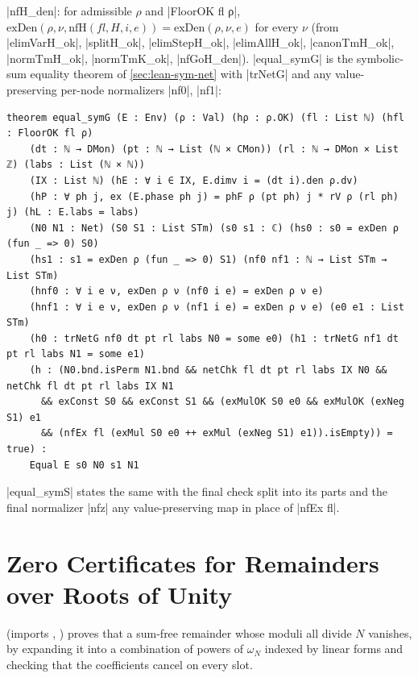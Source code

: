 \begin{theorem}[Soundness]\label{thm:lean-sym-hint}
\begin{sloppypar}\lean|nfH_den|: for admissible $\rho$ and \lean|FloorOK fl ρ|, $\mathrm{exDen}(\rho,\nu,\mathrm{nfH}(fl,H,i,e))=\mathrm{exDen}(\rho,\nu,e)$ for every $\nu$ (from \lean|elimVarH_ok|, \lean|splitH_ok|, \lean|elimStepH_ok|, \lean|elimAllH_ok|, \lean|canonTmH_ok|, \lean|normTmH_ok|, \lean|normTmK_ok|, \lean|nfGoH_den|). \lean|equal_symG| is the symbolic-sum equality theorem of \cref{sec:lean-sym-net} with \lean|trNetG| and any value-preserving per-node normalizers \lean|nf0|, \lean|nf1|:\end{sloppypar}
\begin{lstlisting}[style=lean]
theorem equal_symG (E : Env) (ρ : Val) (hρ : ρ.OK) (fl : List ℕ) (hfl : FloorOK fl ρ)
    (dt : ℕ → DMon) (pt : ℕ → List (ℕ × CMon)) (rl : ℕ → DMon × List ℤ) (labs : List (ℕ × ℕ))
    (IX : List ℕ) (hE : ∀ i ∈ IX, E.dimv i = (dt i).den ρ.dv)
    (hP : ∀ ph j, ex (E.phase ph j) = phF ρ (pt ph) j * rV ρ (rl ph) j) (hL : E.labs = labs)
    (N0 N1 : Net) (S0 S1 : List STm) (s0 s1 : ℂ) (hs0 : s0 = exDen ρ (fun _ => 0) S0)
    (hs1 : s1 = exDen ρ (fun _ => 0) S1) (nf0 nf1 : ℕ → List STm → List STm)
    (hnf0 : ∀ i e ν, exDen ρ ν (nf0 i e) = exDen ρ ν e)
    (hnf1 : ∀ i e ν, exDen ρ ν (nf1 i e) = exDen ρ ν e) (e0 e1 : List STm)
    (h0 : trNetG nf0 dt pt rl labs N0 = some e0) (h1 : trNetG nf1 dt pt rl labs N1 = some e1)
    (h : (N0.bnd.isPerm N1.bnd && netChk fl dt pt rl labs IX N0 && netChk fl dt pt rl labs IX N1
      && exConst S0 && exConst S1 && (exMulOK S0 e0 && exMulOK (exNeg S1) e1
      && (nfEx fl (exMul S0 e0 ++ exMul (exNeg S1) e1)).isEmpty)) = true) :
    Equal E s0 N0 s1 N1
\end{lstlisting}
\lean|equal_symS| states the same with the final check split into its parts and the final normalizer \lean|nfz| any value-preserving map in place of \lean|nfEx fl|.
\end{theorem}

\section{Zero Certificates for Remainders over Roots of Unity}\label{sec:lean-sym-fourier}

 (imports , ) proves that a sum-free remainder whose moduli all divide $N$ vanishes, by expanding it into a combination of powers of $\omega_N$ indexed by linear forms and checking that the coefficients cancel on every slot.


